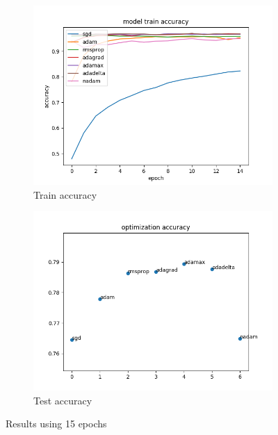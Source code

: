 \documentclass{article}
\begin{document}
\begin{figure}[H]
    \centering
    \begin{subfigure}[b]{0.7\textwidth}
        \includegraphics[width=\textwidth]{15epochstrainacc.png}
        \caption{Train accuracy}
        \label{fig:15epochtrain}
    \end{subfigure}
    \begin{subfigure}[b]{0.7\textwidth}
        \includegraphics[width=\textwidth]{15epochstestacc.png}
        \caption{Test accuracy}
        \label{fig:15epochtest}
    \end{subfigure}
    \caption{Results using 15 epochs}\label{fig:r15e}
\end{figure}
\end{document}
